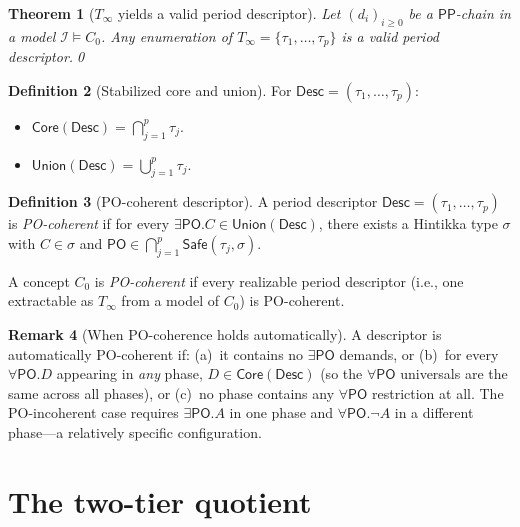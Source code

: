 \documentclass[a4paper,11pt]{article}
\newtheorem{theorem}{Theorem}[section]
\theoremstyle{definition}
\newtheorem{definition}[theorem]{Definition}
\newtheorem{remark}[theorem]{Remark}
\newcommand{\PO}{\ensuremath{\mathsf{PO}}}
\newcommand{\PP}{\ensuremath{\mathsf{PP}}}
\newcommand{\Desc}{\ensuremath{\mathsf{Desc}}}
\newcommand{\Core}{\ensuremath{\mathsf{Core}}}
\newcommand{\Union}{\ensuremath{\mathsf{Union}}}
\newcommand{\Safe}{\ensuremath{\mathsf{Safe}}}
\newcommand{\interp}{\ensuremath{\mathcal{I}}}
\begin{document}
\begin{theorem}[$T_\infty$ yields a valid period descriptor]
\label{thm:tinf-descriptor}
Let $(d_i)_{i \ge 0}$ be a $\PP$-chain in a model $\interp \models C_0$.
Any enumeration of $T_\infty = \{\tau_1, \ldots, \tau_p\}$ is a valid
period descriptor.\qed
\end{theorem}

\begin{definition}[Stabilized core and union]\label{def:core-union}
For $\Desc = (\tau_1, \ldots, \tau_p)$:
\begin{itemize}
\item $\Core(\Desc) = \bigcap_{j=1}^{p} \tau_j$.
\item $\Union(\Desc) = \bigcup_{j=1}^{p} \tau_j$.
\end{itemize}
\end{definition}

\begin{definition}[PO-coherent descriptor]\label{def:po-coherent}
A period descriptor $\Desc = (\tau_1, \ldots, \tau_p)$ is
\emph{PO-coherent} if for every
$\exists\PO.C \in \Union(\Desc)$, there exists a Hintikka type
$\sigma$ with $C \in \sigma$ and
$\PO \in \bigcap_{j=1}^p \Safe(\tau_j, \sigma)$.

A concept $C_0$ is \emph{PO-coherent} if every realizable period
descriptor (i.e., one extractable as $T_\infty$ from a model of $C_0$)
is PO-coherent.
\end{definition}

\begin{remark}[When PO-coherence holds automatically]
\label{rem:po-coherent}
A descriptor is automatically PO-coherent if: (a)~it contains no
$\exists\PO$ demands, or (b)~for every $\forall\PO.D$ appearing in
\emph{any} phase, $D \in \Core(\Desc)$ (so the $\forall\PO$
universals are the same across all phases), or (c)~no phase contains
any $\forall\PO$ restriction at all.  The PO-incoherent case requires
$\exists\PO.A$ in one phase and $\forall\PO.\neg A$ in a different
phase---a relatively specific configuration.
\end{remark}


\section{The two-tier quotient}\label{sec:quotient}
\end{document}
